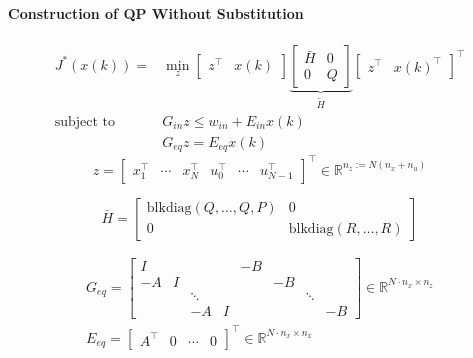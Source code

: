 \paragraph{Construction of QP Without Substitution}
\noindent
\begin{align*}
    J^*(x(k)) =            & \min_{z}\begin{bmatrix}
                                         z^\top & x(k)
                                     \end{bmatrix}
    \underbrace{\begin{bmatrix}
                        \bar{H} & 0 \\
                        0       & Q
                    \end{bmatrix}}_{\widetilde{H}}
    \begin{bmatrix}
        z^\top & {x(k)}^\top
    \end{bmatrix}^\top                                       \\
    \text{subject to}\quad & G_{in} z \leq w_{in} +E_{in} x(k) \\
                           & G_{eq} z = E_{eq} x(k)
\end{align*}
\noindent
\begin{equation*}
    z = \begin{bmatrix}
        x_1^\top & \cdots & x_N^\top & u_0^\top & \cdots & u_{N-1}^\top
    \end{bmatrix}^\top \in \mathbb{R}^{n_z := N(n_x + n_u)}
\end{equation*}

\begin{equation*}
    \bar{H} = \left[
        \begin{array}{c|c} %
            \text{blkdiag}(Q, \ldots, Q, P) & 0                            \\
            \hline %
            0                               & \text{blkdiag}(R, \ldots, R)
        \end{array}
        \right]
\end{equation*}

{\small
    \begin{gather*}
        G_{eq} = \left[
            \begin{array}{cccc|cccc} %
                I  &   &        &   & -B &    &        &    \\
                -A & I &        &   &    & -B &        &    \\
                   &   & \ddots &   &    &    & \ddots &    \\
                   &   & -A     & I &    &    &        & -B
            \end{array}
            \right] \in \mathbb{R}^{N\cdot n_x \times n_z}\\
        E_{eq} = \begin{bmatrix}
            A^\top & 0 & \cdots & 0
        \end{bmatrix}^\top \in \mathbb{R}^{N\cdot n_x \times n_x}
    \end{gather*}
}

